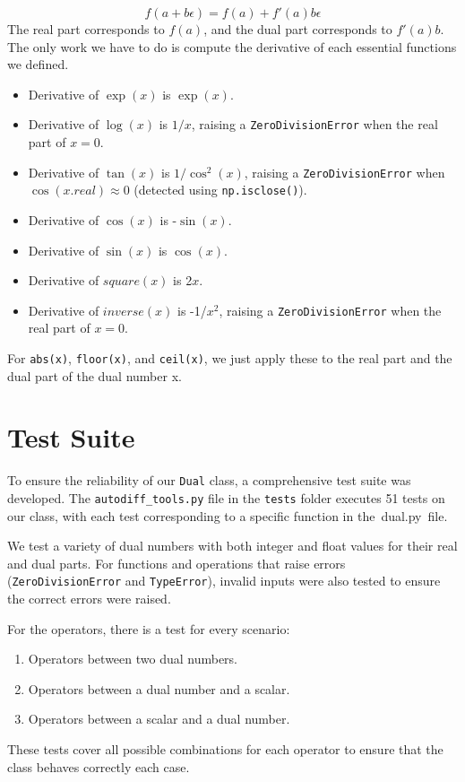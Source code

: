 \documentclass[a4paper,12pt]{article}
\begin{document}
\[
f(a + b\epsilon) = f(a) + f'(a)b\epsilon
\]
The real part corresponds to $f(a)$, and the dual part corresponds to $f'(a)b$.
The only work we have to do is compute the derivative of each essential functions we defined.

\begin{itemize}
    \item Derivative of $\exp(x)$ is $\exp(x)$.
    \item Derivative of $\log(x)$ is $1/x$, raising a \texttt{ZeroDivisionError} when the real part of $x=0$.
    \item Derivative of $\tan(x)$ is $1/\cos^2(x)$, raising a \texttt{ZeroDivisionError} when $\cos(x.real) \approx 0$ (detected using \texttt{np.isclose()}).
    \item Derivative of $\cos(x)$ is -$\sin(x)$.
    \item Derivative of $\sin(x)$ is $\cos(x)$.
    \item Derivative of $square(x)$ is 2$x$.
    \item Derivative of $inverse(x)$ is -1/$x^2$, raising a \texttt{ZeroDivisionError} when the real part of $x=0$.


\end{itemize}

For \texttt{abs(x)}, \texttt{floor(x)}, and \texttt{ceil(x)}, we just apply these to the real part and the dual part of the dual number x.

\section{Test Suite}

\label{sec:tests}
To ensure the reliability of our \texttt{Dual} class, a comprehensive test suite was developed. 
The \texttt{autodiff\_tools.py} file in the \texttt{tests} folder executes 51 tests on our class, with each test corresponding to a specific function in the dual.py file. 

We test a variety of dual numbers with both integer and float values for their real and dual parts. For functions and operations that raise errors (\texttt{ZeroDivisionError} and \texttt{TypeError}), invalid inputs were also tested to ensure the correct errors were raised.

\vspace{10pt}

For the operators, there is a test for every scenario:
\begin{enumerate}
    \item Operators between two dual numbers.
    \item Operators between a dual number and a scalar.
    \item Operators between a scalar and a dual number.
\end{enumerate}
These tests cover all possible combinations for each operator to ensure that the class behaves correctly each case.
\end{document}
